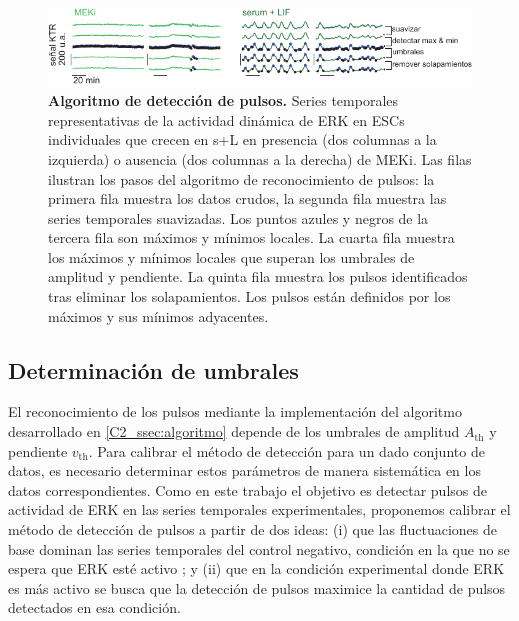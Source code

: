\documentclass[./main.tex]{subfiles}
\begin{document}
\begin{figure}
    \centering
    \includegraphics[width=1\columnwidth]{figures/chapter2/C2_algoritmo_pulse_detection.pdf} 
    \caption{\textbf{Algoritmo de detección de pulsos.} Series temporales representativas de la actividad dinámica de ERK en ESCs individuales que crecen en s+L en presencia (dos columnas a la izquierda) o ausencia (dos columnas a la derecha) de MEKi. Las filas ilustran los pasos del algoritmo de reconocimiento de pulsos: la primera fila muestra los datos crudos, la segunda fila muestra las series temporales suavizadas. Los puntos azules y negros de la tercera fila son máximos y mínimos locales. La cuarta fila muestra los máximos y mínimos locales que superan los umbrales de amplitud y pendiente. La quinta fila muestra los pulsos identificados tras eliminar los solapamientos. Los pulsos están definidos por los máximos y sus mínimos adyacentes.}
    \label{C2_fig:algoritmo_pulse_detection}
\end{figure}


\subsection{Determinación de umbrales}


El reconocimiento de los pulsos mediante la implementación del algoritmo desarrollado en \ref{C2_ssec:algoritmo} depende de los umbrales de amplitud $A_{\text{th}}$ y pendiente $v_{\text{th}}$. Para calibrar el método de detección para un dado conjunto de datos, es necesario determinar estos parámetros de manera sistemática en los datos correspondientes. Como en este trabajo el objetivo es detectar pulsos de actividad de ERK en las series temporales experimentales, proponemos calibrar el método de detección de pulsos a partir de dos ideas: (i) que las fluctuaciones de base dominan las series temporales del control negativo, condición en la que no se espera que ERK esté activo ; y (ii) que en la condición experimental donde ERK es más activo se busca que la detección de pulsos maximice la cantidad de pulsos detectados en esa condición. 
\end{document}
